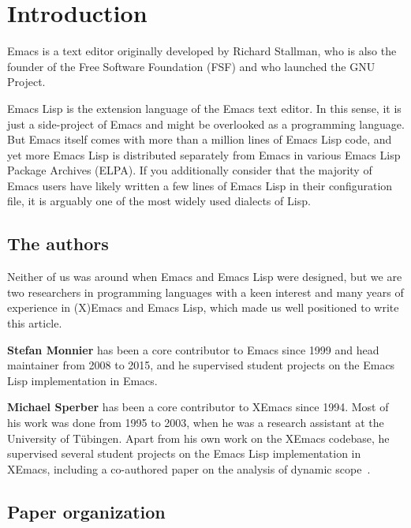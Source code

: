 \documentclass[format=acmsmall, review]{acmart}
\newcommand \Elisp {Emacs Lisp}
\begin{document}
\section{Introduction}

Emacs is a text editor originally developed by Richard Stallman, who is also
the founder of the Free Software Foundation (FSF) and who launched the GNU
Project.

\Elisp{} is the extension language of the Emacs text editor.
In this sense, it is just a side-project of Emacs and might be overlooked as
a programming language.  But Emacs itself comes with more than a million
lines of \Elisp{} code, and yet more \Elisp{} is distributed separately from
Emacs in various Emacs Lisp Package Archives (ELPA).  If you additionally
consider that the majority of Emacs users have likely written a few lines of
\Elisp{} in their configuration file, it is arguably one of the most widely
used dialects of Lisp.


\subsection{The authors}

Neither of us was around when Emacs and \Elisp{} were designed, but we are
two researchers in programming languages with a keen interest and many
years of
experience in (X)Emacs and \Elisp{}, which made us well positioned to write
this article.

\smallskip

\noindent\textbf{Stefan Monnier} has been a core contributor to Emacs since
1999 and head maintainer from 2008 to 2015, and he supervised student
projects on the \Elisp{} implementation in Emacs.

\smallskip

\noindent\textbf{Michael Sperber} has been a core contributor to XEmacs since 1994.
Most of his work was done from 1995 to 2003, when he was a research
assistant at the University of Tübingen.  Apart from his own work on
the XEmacs codebase, he supervised several student projects on the
\Elisp{} implementation in XEmacs, including a co-authored paper on the
analysis of dynamic scope~\cite{Neubauer01}.

\subsection{Paper organization}
\end{document}
